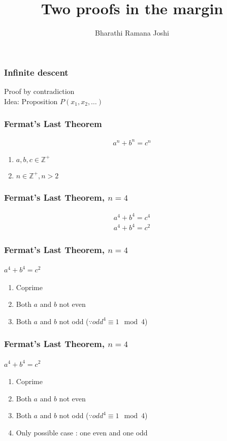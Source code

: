\documentclass{beamer}
\title{Two proofs in the margin}
\author{Bharathi Ramana Joshi}
\begin{document}
\maketitle
\begin{frame}
    \frametitle{Infinite descent}
    Proof by contradiction\\
    Idea: Proposition $P(x_1,x_2,\dots)$
\end{frame}

\begin{frame}
    \frametitle{Fermat's Last Theorem}
    \begin{gather*}
        a^n+b^n=c^n
    \end{gather*}
    \begin{enumerate}
        \item $a,b,c\in\mathbb{Z}^+$
        \item $n\in\mathbb{Z}^+,n>2$
    \end{enumerate}
\end{frame}

\begin{frame}
    \frametitle{Fermat's Last Theorem, $n = 4$}
    \begin{gather}
        a^4+b^4=c^4\\
        a^4+b^4=c^2
    \end{gather}
\end{frame}

\begin{frame}
    \frametitle{Fermat's Last Theorem, $n = 4$}
    \framesubtitle{$a^4+b^4=c^2$}
    \begin{enumerate}
        \item Coprime
        \item Both $a$ and $b$ not even
        \item Both $a$ and $b$ not odd ($\because odd^4\equiv 1 \mod 4$)
    \end{enumerate}
\end{frame}

\begin{frame}
    \frametitle{Fermat's Last Theorem, $n = 4$}
    \framesubtitle{$a^4+b^4=c^2$}
    \begin{enumerate}
        \item Coprime
        \item Both $a$ and $b$ not even
        \item Both $a$ and $b$ not odd ($\because odd^4\equiv 1 \mod 4$)
        \item Only possible case : one even and one odd
    \end{enumerate}
\end{frame}
\end{document}
